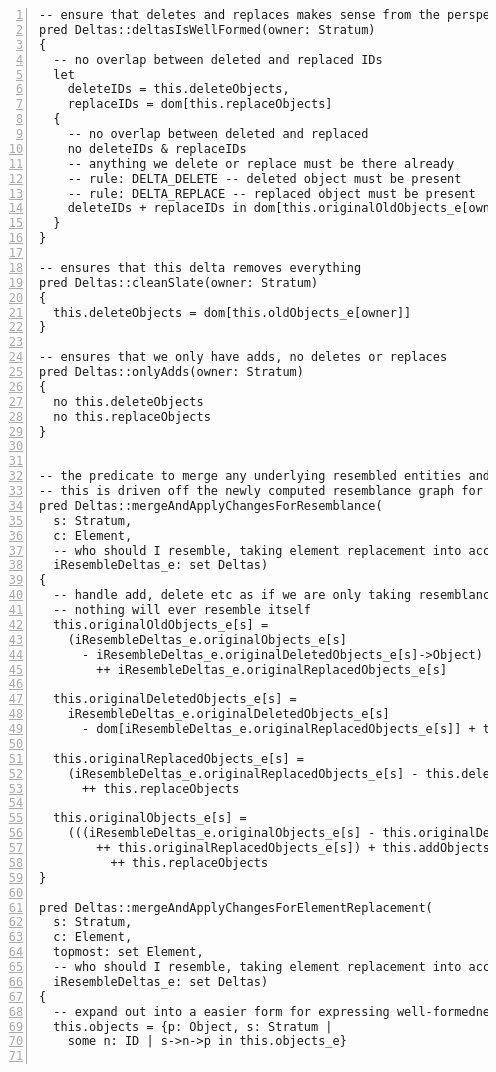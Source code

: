 \begin{lstlisting}[caption={base\_deltas.als}, numbers=left]
-- ensure that deletes and replaces makes sense from the perspective of the original stratum
pred Deltas::deltasIsWellFormed(owner: Stratum)
{
  -- no overlap between deleted and replaced IDs
  let
    deleteIDs = this.deleteObjects,
    replaceIDs = dom[this.replaceObjects]
  {
    -- no overlap between deleted and replaced
    no deleteIDs & replaceIDs
    -- anything we delete or replace must be there already
    -- rule: DELTA_DELETE -- deleted object must be present
    -- rule: DELTA_REPLACE -- replaced object must be present
    deleteIDs + replaceIDs in dom[this.originalOldObjects_e[owner]]
  }
}

-- ensures that this delta removes everything
pred Deltas::cleanSlate(owner: Stratum)
{
  this.deleteObjects = dom[this.oldObjects_e[owner]]
}

-- ensures that we only have adds, no deletes or replaces
pred Deltas::onlyAdds(owner: Stratum)
{
  no this.deleteObjects
  no this.replaceObjects
}


-- the predicate to merge any underlying resembled entities and apply current changes
-- this is driven off the newly computed resemblance graph for each component in each stratum
pred Deltas::mergeAndApplyChangesForResemblance(
  s: Stratum,
  c: Element,
  -- who should I resemble, taking element replacement into account
  iResembleDeltas_e: set Deltas)
{
  -- handle add, delete etc as if we are only taking resemblance into account
  -- nothing will ever resemble itself
  this.originalOldObjects_e[s] =
    (iResembleDeltas_e.originalObjects_e[s]
      - iResembleDeltas_e.originalDeletedObjects_e[s]->Object)
        ++ iResembleDeltas_e.originalReplacedObjects_e[s]
        
  this.originalDeletedObjects_e[s] =
    iResembleDeltas_e.originalDeletedObjects_e[s]
      - dom[iResembleDeltas_e.originalReplacedObjects_e[s]] + this.deleteObjects
    
  this.originalReplacedObjects_e[s] =
    (iResembleDeltas_e.originalReplacedObjects_e[s] - this.deleteObjects->Object)
      ++ this.replaceObjects
      
  this.originalObjects_e[s] = 
    (((iResembleDeltas_e.originalObjects_e[s] - this.originalDeletedObjects_e[s]->Object)
        ++ this.originalReplacedObjects_e[s]) + this.addObjects)
          ++ this.replaceObjects  
}

pred Deltas::mergeAndApplyChangesForElementReplacement(
  s: Stratum,
  c: Element,
  topmost: set Element,
  -- who should I resemble, taking element replacement into account
  iResembleDeltas_e: set Deltas)
{
  -- expand out into a easier form for expressing well-formedness rule, where IDs don't count
  this.objects = {p: Object, s: Stratum |
    some n: ID | s->n->p in this.objects_e}


\end{lstlisting}
